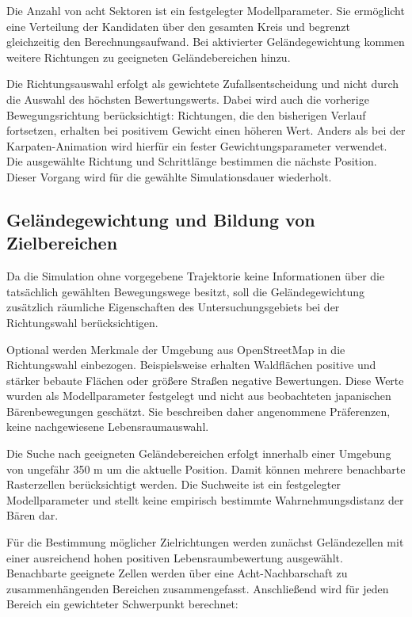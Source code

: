 \documentclass[12pt,a4paper]{report}
\begin{document}
Die Anzahl von acht Sektoren ist ein festgelegter Modellparameter.
Sie ermöglicht eine Verteilung der Kandidaten über den gesamten
Kreis und begrenzt gleichzeitig den Berechnungsaufwand.
Bei aktivierter Geländegewichtung kommen weitere Richtungen
zu geeigneten Geländebereichen hinzu.

Die Richtungsauswahl erfolgt als gewichtete Zufallsentscheidung
und nicht durch die Auswahl des höchsten Bewertungswerts.
Dabei wird auch die vorherige Bewegungsrichtung berücksichtigt:
Richtungen, die den bisherigen Verlauf fortsetzen, erhalten
bei positivem Gewicht einen höheren Wert. Anders als bei der
Karpaten-Animation wird hierfür ein fester Gewichtungsparameter
verwendet. Die ausgewählte Richtung und Schrittlänge bestimmen
die nächste Position. Dieser Vorgang wird für die gewählte
Simulationsdauer wiederholt.

\subsection{Geländegewichtung und Bildung von Zielbereichen}


Da die Simulation ohne vorgegebene Trajektorie
keine Informationen über die tatsächlich
gewählten Bewegungswege besitzt, soll die
Geländegewichtung zusätzlich räumliche
Eigenschaften des Untersuchungsgebiets
bei der Richtungswahl berücksichtigen.

Optional werden Merkmale der Umgebung aus OpenStreetMap in die
Richtungswahl einbezogen. Beispielsweise erhalten Waldflächen
positive und stärker bebaute Flächen oder größere Straßen
negative Bewertungen. Diese Werte wurden als Modellparameter
festgelegt und nicht aus beobachteten japanischen
Bärenbewegungen geschätzt. Sie beschreiben daher angenommene
Präferenzen, keine nachgewiesene Lebensraumauswahl.

Die Suche nach geeigneten Geländebereichen erfolgt innerhalb
einer Umgebung von ungefähr 350 m um die aktuelle Position.
Damit können mehrere benachbarte Rasterzellen berücksichtigt
werden. Die Suchweite ist ein festgelegter Modellparameter
und stellt keine empirisch bestimmte Wahrnehmungsdistanz
der Bären dar.

Für die Bestimmung möglicher Zielrichtungen werden zunächst
Geländezellen mit einer ausreichend hohen positiven
Lebensraumbewertung ausgewählt. Benachbarte geeignete Zellen
werden über eine Acht-Nachbarschaft zu zusammenhängenden
Bereichen zusammengefasst. Anschließend wird für jeden
Bereich ein gewichteter Schwerpunkt berechnet:
\end{document}
